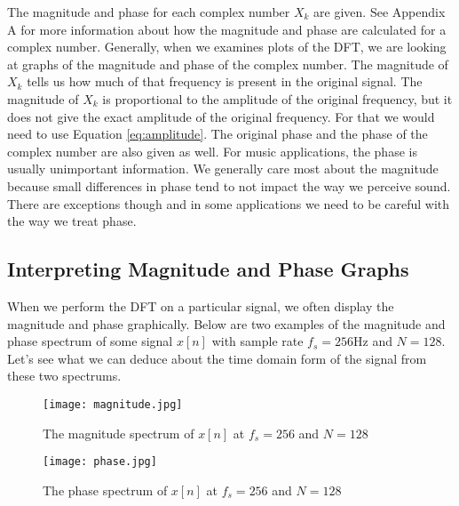 	The magnitude and phase for
each complex number $X_k$ are given.  See Appendix A for more information about how the magnitude and phase
are calculated for a complex number.  Generally, when we examines plots of the DFT, we are looking at graphs
of the magnitude and phase of the complex number.  The magnitude of $X_k$ tells us how much of that frequency
 is present in the original signal.  The magnitude of $X_k$ is proportional to the amplitude of 
 the original frequency, but it does not give the exact amplitude of the original frequency.  
 For that we would need to use Equation \ref{eq:amplitude}.  The original phase and the phase of the complex 
 number are also given as well.  For music applications, the phase is usually unimportant
 information.  We generally care most about the magnitude because small differences in phase tend to not
 impact the way we perceive sound.  There are exceptions though and in some applications we need to be 
 careful with the way we treat phase.

\subsection*{Interpreting Magnitude and Phase Graphs}

When we perform the DFT on a particular signal, we often display the magnitude and phase graphically.  Below
are two examples of the magnitude and phase spectrum of some signal $x[n]$ with sample rate $f_s = 256$Hz and
$N = 128$.  Let's see what we can
deduce about the time domain form of the signal from these two spectrums.

\begin{figure}[h]
	\caption{The magnitude spectrum of $x[n]$ at $f_s = 256$ and $N = 128$}
	\label{fig:magnitudeGraph}
	\begin{center}
	\texttt{[image: magnitude.jpg]}
	\end{center}
\end{figure}

\begin{figure}[h]
	\caption{The phase spectrum of $x[n]$ at $f_s = 256$ and $N = 128$}
	\label{fig:phaseGraph}
	\begin{center}
		\texttt{[image: phase.jpg]}
	\end{center}
\end{figure}

